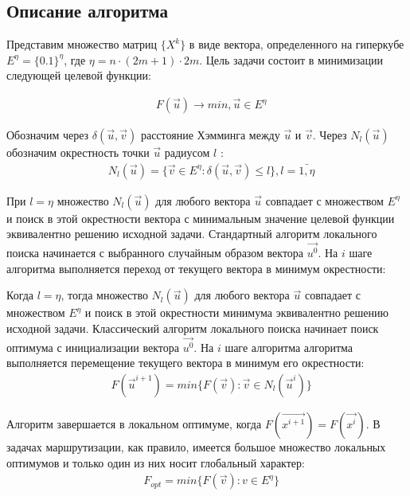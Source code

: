 \documentclass[]{TAACpaper}
\begin{document}
\subsection{Описание алгоритма}
Представим множество матриц $\{X^k\}$ в виде вектора, определенного на гиперкубе $E^\eta=\{0.1\}^\eta$, где $\eta=n\cdot(2m+1)\cdot 2m$. Цель задачи состоит в минимизации следующей целевой функции:
		
\begin{align} 
& F(\vec{u})\to min,\vec{u}\in E^{\eta}
\end{align}	

Обозначим через $\delta(\vec{u},\vec{v})$ расстояние Хэмминга между $\vec{u}$ и $\vec{v}$. Через $N_l(\vec{u})$ обозначим окрестность точки $\vec{u}$ радиусом $l$ \cite{vrp_shafeyev}:
\begin{align} 
& N_l(\vec{u})=\{\vec{v} \in E^{\eta}:\delta(\vec{u},\vec{v})\le l \}, l=\bar{1,\eta}
\end{align}	


При $l=\eta$ множество $N_l(\vec{u})$ для любого вектора $ \vec{u} $ совпадает с множеством $E^{\eta}$ и поиск в этой окрестности вектора с минимальным значение целевой функции эквивалентно решению исходной задачи. Стандартный алгоритм локального поиска начинается с выбранного случайным образом вектора $\vec{u^0}$. На $i$ шаге алгоритма выполняется переход от текущего вектора в минимум окрестности:

Когда $l=\eta$, тогда множество $ N_l(\vec{u})$ для любого вектора $\vec{u}$ совпадает с множеством $E^{\eta}$  и поиск в этой окрестности минимума эквивалентно решению исходной задачи. Классический алгоритм локального поиска начинает поиск оптимума с  инициализации вектора $\vec{u^0}$.
На $i$ шаге алгоритма  алгоритма выполняется перемещение текущего вектора в минимум его окрестности:
\begin{align} 
& F(\vec{u}^{i+1})=min\{F(\vec{v}):\vec{v} \in N_l(\vec{u}^i)\}
\end{align}	

Алгоритм завершается в локальном оптимуме, когда $F(\vec{x^{i+1}})=F(\vec{x^i})$. В задачах маршрутизации, как правило, имеется большое множество локальных оптимумов и только один из них носит глобальный характер:
\begin{align} 
& F_{opt}=min\{F(\vec{v}):v \in E^{\eta}\}
\end{align}	
\end{document}
